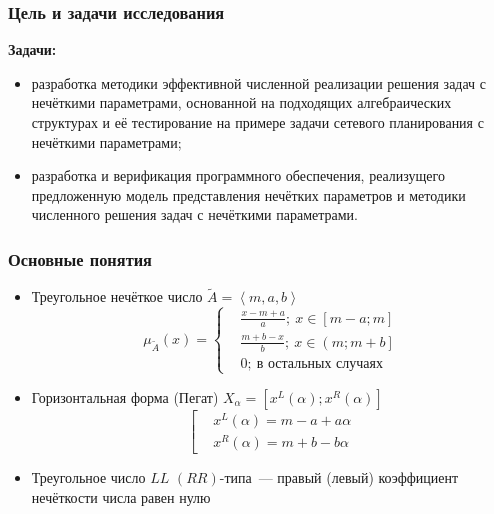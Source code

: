 \documentclass[12pt]{beamer}
\begin{document}

\begin{frame}
  \frametitle{Цель и задачи исследования}
  \textbf{Задачи:}
  \begin{itemize}
    \item разработка методики эффективной численной реализации решения задач с нечёткими параметрами, основанной на подходящих алгебраических структурах и её тестирование на примере задачи сетевого планирования с нечёткими параметрами;
    \item разработка и верификация программного обеспечения, реализущего предложенную модель представления нечётких параметров и методики численного решения задач с нечёткими параметрами.
  \end{itemize}  
\end{frame}



\begin{frame}
  \frametitle{Основные понятия}
  \begin{itemize}
    \item Треугольное нечёткое число $\tilde A = \left\langle m,a,b \right\rangle $
      \begin{equation}
        \mu_{\tilde A}\left( x \right)=
        \left\{ \begin{aligned}
			& \frac{x-m+a}{a};\ x\in \left[ m-a;m \right] \\ 
			& \frac{m+b-x}{b};\ x\in \left( m;m+b \right] \\ 
			& 0;\ \text{в остальных случаях} 
	 	\end{aligned} \right.
      \end{equation}
    \item Горизонтальная форма (Пегат) $X_\alpha = \left[x^L(\alpha); x^R(\alpha) \right]$
      \begin{equation}
        \left[ 
          \begin{aligned}
            & x^L(\alpha )=m-a+a\alpha  \\ 
            & x^R(\alpha )=m+b-b\alpha
          \end{aligned}
        \right.
      \end{equation}
    \item Треугольное число $LL$ $\left( RR \right)$-типа~--- правый (левый) коэффициент нечёткости числа равен нулю
  \end{itemize}
\end{frame}
\end{document}
